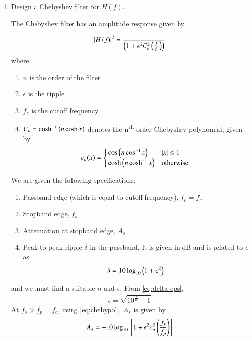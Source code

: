 \documentclass[journal,12pt,twocolumn]{IEEEtran}
\renewcommand\thesection{\arabic{section}}
\begin{document}
\begin{enumerate}[label=\thesection.\arabic*
,ref=\thesection.\theenumi]
\item Design a Chebyshev filter for $H(f)$.

\solution The Chebyshev filter has an amplitude response
given by
\begin{align}
    \left\vert H\left(f\right)\right\vert^2 = \frac{1}{\left(1 + \epsilon^2C_n^2\left(\frac{f}{f_c}\right)\right)}
\end{align}
where 
\begin{enumerate}
    \item $n$ is the order of the filter
    \item $\epsilon$ is the ripple
    \item $f_c$ is the cutoff frequency 
    \item $C_n = \cosh^{-1}\left(n\cosh{x}\right)$ denotes 
    the n\textsuperscript{th} order Chebyshev polynomial,
    given by
    \begin{align}
        c_n(x) =
        \begin{cases}
            \cos\left(n\cos^{-1}x\right) & \left\vert x\right\vert \le 1 \\
            \cosh\left(n\cosh^{-1}x\right) & \textrm{otherwise}
        \end{cases}
        \label{eq:chebypol}
    \end{align}
\end{enumerate}
We are given the following specifications:
\begin{enumerate}
    \item Passband edge (which is equal to 
    cutoff frequency), $f_p = f_c$
    \item Stopband edge, $f_s$
    \item Attenuation at stopband edge, $A_s$
    \item Peak-to-peak ripple $\delta$ in the passband.
    It is given in dB and is related to $\epsilon$ as
    \begin{align}
        \delta = 10\log_{10}\left(1 + \epsilon^2\right)
        \label{eq:delta-eps}
    \end{align}
\end{enumerate}
and we must find a suitable $n$ and $\epsilon$. From
\eqref{eq:delta-eps},
\begin{align}
    \epsilon = \sqrt{10^{\frac{\delta}{10}} - 1}
    \label{eq:epsilon-del}
\end{align}
At $f_s > f_p = f_c$, using \eqref{eq:chebypol}, $A_s$ is given by
\begin{align}
    A_s = -10\log_{10}\sbrak{1 + \epsilon^2c_n^2\brak{\frac{f_s}{f_p}}} \\

\end{align}
\end{enumerate}
\end{document}
